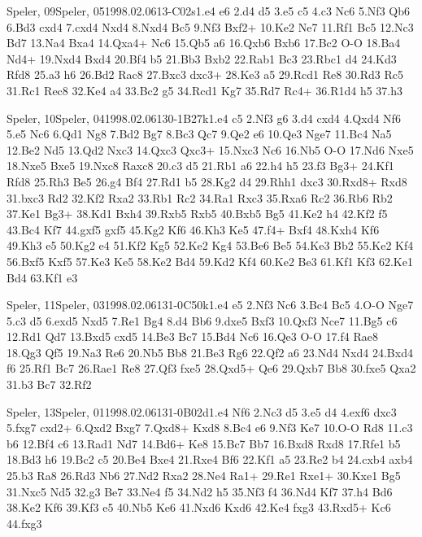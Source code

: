 \documentclass[twocolumn,a4paper,10pt]{report}
\begin{document}
\begin{chessgame}{Speler, 09}{Speler, 05}{1998.02.06}{13}{\textonehalf-\textonehalf}{C02s}{1.e4 e6 2.d4 d5 3.e5 c5 4.c3 Nc6 5.Nf3 Qb6 6.Bd3 cxd4 7.cxd4 Nxd4 8.Nxd4 Bc5 9.Nf3 Bxf2+ 10.Ke2 Ne7 11.Rf1 Bc5 12.Nc3 Bd7 13.Na4 Bxa4 14.Qxa4+ Nc6 15.Qb5 a6 16.Qxb6 Bxb6 17.Bc2 O-O 18.Ba4 Nd4+ 19.Nxd4 Bxd4 20.Bf4 b5 21.Bb3 Bxb2 22.Rab1 Bc3 23.Rbc1 d4 24.Kd3 Rfd8 25.a3 h6 26.Bd2 Rac8 27.Bxc3 dxc3+ 28.Ke3 a5 29.Rcd1 Re8 30.Rd3 Rc5 31.Rc1 Rec8 32.Ke4 a4 33.Bc2 g5 34.Rcd1 Kg7 35.Rd7 Rc4+ 36.R1d4 h5 37.h3}\end{chessgame}
\begin{chessgame}{Speler, 10}{Speler, 04}{1998.02.06}{13}{0-1}{B27k}{1.e4 c5 2.Nf3 g6 3.d4 cxd4 4.Qxd4 Nf6 5.e5 Nc6 6.Qd1 Ng8 7.Bd2 Bg7 8.Bc3 Qc7 9.Qe2 e6 10.Qe3 Nge7 11.Bc4 Na5 12.Be2 Nd5 13.Qd2 Nxc3 14.Qxc3 Qxc3+ 15.Nxc3 Nc6 16.Nb5 O-O 17.Nd6 Nxe5 18.Nxe5 Bxe5 19.Nxc8 Raxc8 20.c3 d5 21.Rb1 a6 22.h4 h5 23.f3 Bg3+ 24.Kf1 Rfd8 25.Rh3 Be5 26.g4 Bf4 27.Rd1 b5 28.Kg2 d4 29.Rhh1 dxc3 30.Rxd8+ Rxd8 31.bxc3 Rd2 32.Kf2 Rxa2 33.Rb1 Rc2 34.Ra1 Rxc3 35.Rxa6 Rc2 36.Rb6 Rb2 37.Ke1 Bg3+ 38.Kd1 Bxh4 39.Rxb5 Rxb5 40.Bxb5 Bg5 41.Ke2 h4 42.Kf2 f5 43.Bc4 Kf7 44.gxf5 gxf5 45.Kg2 Kf6 46.Kh3 Ke5 47.f4+ Bxf4 48.Kxh4 Kf6 49.Kh3 e5 50.Kg2 e4 51.Kf2 Kg5 52.Ke2 Kg4 53.Be6 Be5 54.Ke3 Bb2 55.Ke2 Kf4 56.Bxf5 Kxf5 57.Ke3 Ke5 58.Ke2 Bd4 59.Kd2 Kf4 60.Ke2 Be3 61.Kf1 Kf3 62.Ke1 Bd4 63.Kf1 e3}\end{chessgame}
\begin{chessgame}{Speler, 11}{Speler, 03}{1998.02.06}{13}{1-0}{C50k}{1.e4 e5 2.Nf3 Nc6 3.Bc4 Bc5 4.O-O Nge7 5.c3 d5 6.exd5 Nxd5 7.Re1 Bg4 8.d4 Bb6 9.dxe5 Bxf3 10.Qxf3 Nce7 11.Bg5 c6 12.Rd1 Qd7 13.Bxd5 cxd5 14.Be3 Bc7 15.Bd4 Nc6 16.Qe3 O-O 17.f4 Rae8 18.Qg3 Qf5 19.Na3 Re6 20.Nb5 Bb8 21.Be3 Rg6 22.Qf2 a6 23.Nd4 Nxd4 24.Bxd4 f6 25.Rf1 Bc7 26.Rae1 Re8 27.Qf3 fxe5 28.Qxd5+ Qe6 29.Qxb7 Bb8 30.fxe5 Qxa2 31.b3 Bc7 32.Rf2}\end{chessgame}
\begin{chessgame}{Speler, 13}{Speler, 01}{1998.02.06}{13}{1-0}{B02d}{1.e4 Nf6 2.Nc3 d5 3.e5 d4 4.exf6 dxc3 5.fxg7 cxd2+ 6.Qxd2 Bxg7 7.Qxd8+ Kxd8 8.Bc4 e6 9.Nf3 Ke7 10.O-O Rd8 11.c3 b6 12.Bf4 c6 13.Rad1 Nd7 14.Bd6+ Ke8 15.Bc7 Bb7 16.Bxd8 Rxd8 17.Rfe1 b5 18.Bd3 h6 19.Bc2 c5 20.Be4 Bxe4 21.Rxe4 Bf6 22.Kf1 a5 23.Re2 b4 24.cxb4 axb4 25.b3 Ra8 26.Rd3 Nb6 27.Nd2 Rxa2 28.Ne4 Ra1+ 29.Re1 Rxe1+ 30.Kxe1 Bg5 31.Nxc5 Nd5 32.g3 Be7 33.Ne4 f5 34.Nd2 h5 35.Nf3 f4 36.Nd4 Kf7 37.h4 Bd6 38.Ke2 Kf6 39.Kf3 e5 40.Nb5 Ke6 41.Nxd6 Kxd6 42.Ke4 fxg3 43.Rxd5+ Kc6 44.fxg3}\end{chessgame}
\end{document}
